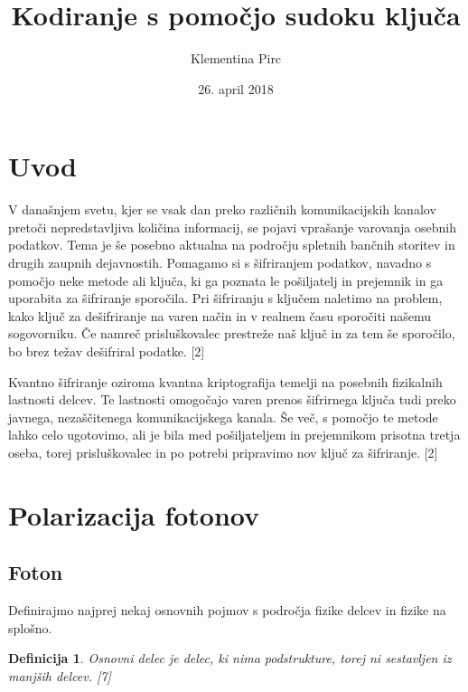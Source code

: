 \documentclass[A4paper, 11pt]{article}
\title{Kodiranje s pomočjo sudoku ključa}
\author{Klementina Pirc}
\affil{Fakulteta za matematiko in fiziko \\ Oddelek za matematiko}
\date{26. april 2018}
\newtheorem{definicija}{Definicija}
\begin{document}
\begin{titlepage} 

\maketitle
\thispagestyle{empty}
	
\end{titlepage}



\section{Uvod}

V današnjem svetu, kjer se vsak dan preko različnih komunikacijskih kanalov pretoči nepredstavljiva količina informacij, se pojavi vprašanje varovanja osebnih podatkov. Tema je še posebno aktualna na področju spletnih bančnih storitev in drugih zaupnih dejavnostih. Pomagamo si s šifriranjem podatkov, navadno s pomočjo neke metode ali ključa, ki ga poznata le pošiljatelj in prejemnik in ga uporabita za šifriranje sporočila. Pri šifriranju s ključem naletimo na problem, kako ključ za dešifriranje na varen način in v realnem času sporočiti našemu sogovorniku. Če namreč prisluškovalec prestreže naš ključ in za tem še sporočilo, bo brez težav dešifriral podatke. [2]

Kvantno šifriranje oziroma kvantna kriptografija temelji na posebnih fizikalnih lastnosti delcev. Te lastnosti omogočajo varen prenos šifrirnega ključa tudi preko javnega, nezaščitenega komunikacijskega kanala. Še več, s pomočjo te metode lahko celo ugotovimo, ali je bila med pošiljateljem in prejemnikom prisotna tretja oseba, torej prisluškovalec in po potrebi pripravimo nov ključ za šifriranje. [2]



\section{Polarizacija fotonov}

\subsection{Foton}

Definirajmo najprej nekaj osnovnih pojmov s področja fizike delcev in fizike na splošno.

\begin{definicija}
Osnovni delec je delec, ki nima podstrukture, torej ni sestavljen iz manjših delcev. [7]
\end{definicija}
\end{document}
